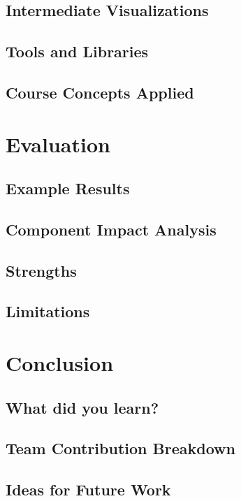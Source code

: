 \documentclass[12pt,twocolumn]{extarticle}
\begin{document}
\subsection{Intermediate Visualizations}

\subsection{Tools and Libraries}

\subsection{Course Concepts Applied}

\section{Evaluation}

\subsection{Example Results}

\subsection{Component Impact Analysis}

\subsection{Strengths}

\subsection{Limitations}

\section{Conclusion}

\subsection{What did you learn?}

\subsection{Team Contribution Breakdown}

\subsection{Ideas for Future Work}
\end{document}
